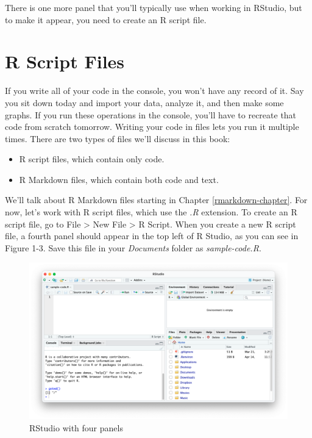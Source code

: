 \documentclass[
]{book}
\providecommand{\tightlist}{%
  \setlength{\itemsep}{0pt}\setlength{\parskip}{0pt}}
\begin{document}
There is one more panel that you'll typically use when working in RStudio, but to make it appear, you need to create an R script file.

\hypertarget{r-script-files}{%
\section*{R Script Files}\label{r-script-files}}

If you write all of your code in the console, you won't have any record of it. Say you sit down today and import your data, analyze it, and then make some graphs. If you run these operations in the console, you'll have to recreate that code from scratch tomorrow. Writing your code in files lets you run it multiple times. There are two types of files we'll discuss in this book:

\begin{itemize}
\tightlist
\item
  R script files, which contain only code.
\item
  R Markdown files, which contain both code and text.
\end{itemize}

We'll talk about R Markdown files starting in Chapter \ref{rmarkdown-chapter}. For now, let's work with R script files, which use the \emph{.R} extension. To create an R script file, go to File \textgreater{} New File \textgreater{} R Script. When you create a new R script file, a fourth panel should appear in the top left of R Studio, as you can see in Figure 1-3. Save this file in your \emph{Documents} folder as \emph{sample-code.R}.

\begin{figure}
\includegraphics[width=1\linewidth]{assets/rstudio-four-panels} \caption{RStudio with four panels}\label{fig:rstudio-four-panels}
\end{figure}
\end{document}
